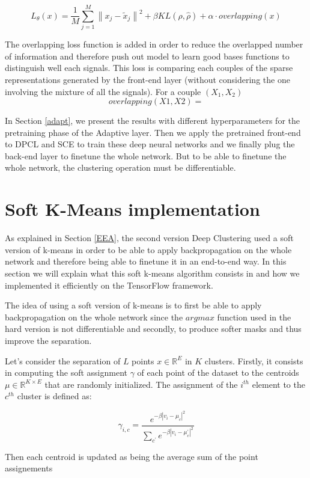 \documentclass[master,final,11pt]{iscs-thesis}
\newcommand{\norm}[1]{\left\lVert#1\right\rVert}
\begin{document}
\[L_\theta(x) = \frac{1}{M}\sum_{j=1}^{M}{\norm{x_j - \tilde{x}_j}}^2 + \beta KL(\rho, \hat{\rho}) + \alpha \cdot overlapping(x)\]

The overlapping loss function is added in order to reduce the overlapped number of information and therefore push out model to learn good bases functions to distinguish well each signals. This loss is comparing each couples of the sparse representations generated by the front-end layer (without considering the one involving the mixture of all the signals). For a couple $(X_1,X_2)$
\[overlapping(X1, X2) = \] 

In Section \ref{adapt}, we present the results with different hyperparameters for the pretraining phase of the Adaptive layer. Then we apply the pretrained front-end to DPCL and SCE to train these deep neural networks and we finally plug the back-end layer to finetune the whole network. But to be able to finetune the whole network, the clustering operation must be differentiable.

\section{Soft K-Means implementation}

As explained in Section \ref{EEA}, the second version Deep Clustering used a soft version of k-means in order to be able to apply backpropagation on the whole network and therefore being able to finetune it in an end-to-end way. In this section we will explain what this soft k-means algorithm consists in and how we implemented it efficiently on the TensorFlow framework.

The idea of using a soft version of k-means is to first be able to apply backpropagation on the whole network since the $argmax$ function used in the hard version is not differentiable and secondly, to produce softer masks and thus improve the separation. 

Let's consider the separation of $L$ points $x \in \mathbb{R}^E$ in $K$ clusters. Firstly, it consists in computing the soft assignment $\gamma$ of each point of the dataset to the centroids $\mu \in \mathbb{R}^{K\times E}$ that are randomly initialized. The assignment of the $i^{th}$ element to the $c^{th}$ cluster is defined as:

\[ \gamma_{i,c} = \frac{e^{-\beta |v_i-\mu_c|^2}}{\sum_{c^\prime} e^{-\beta |v_i-\mu_c^\prime|^2}}  \]

Then each centroid is updated as being the average sum of the point assignements
\end{document}
